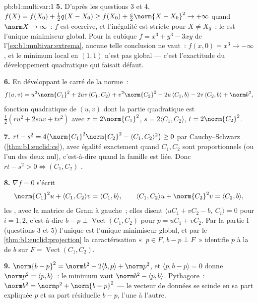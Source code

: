 \begin{solution}{pb:b1:multivar:1}
\textbf{5.} D'après les questions 3 et 4, $f(X) = f(X_0) + \frac12
q(X - X_0) \geq f(X_0) + \frac c2\norm{X - X_0}^2 \to +\infty$
quand $\norm X \to \infty$~: $f$ est coercive, et l'inégalité est
stricte pour $X \neq X_0$~: le  est l'unique
minimiseur global. Pour la cubique $f = x^3 + y^3 - 3xy$ de
l'\cref{ex:b1:multivar:extrema}, aucune telle conclusion ne vaut~:
$f(x,0) = x^3 \to -\infty$, et le minimum local en $(1,1)$ n'est
pas global --- c'est l'exactitude du développement quadratique qui
faisait défaut.

\textbf{6.} En développant le carré de la norme~:
\[
f(u,v) = u^2\norm{C_1}^2 + 2uv\,\langle C_1, C_2\rangle +
v^2\norm{C_2}^2 - 2u\,\langle C_1, b\rangle - 2v\,\langle C_2,
b\rangle + \norm b^2 ,
\]
fonction quadratique de $(u, v)$ dont la partie quadratique est
$\frac12(ru^2 + 2suv + tv^2)$ avec $r = 2\norm{C_1}^2$, $s =
2\langle C_1, C_2\rangle$, $t = 2\norm{C_2}^2$.

\textbf{7.} $rt - s^2 = 4\bigl(\norm{C_1}^2\norm{C_2}^2 -
\langle C_1, C_2\rangle^2\bigr) \geq 0$ par Cauchy--Schwarz
(\cref{thm:b1:euclid:cs}), avec égalité exactement quand $C_1, C_2$
sont proportionnels (ou l'un des deux nul), c'est-à-dire quand la
famille est liée. Donc $rt - s^2 > 0 \iff (C_1, C_2)$ .

\textbf{8.} $\nabla f = 0$ s'écrit
\[
\norm{C_1}^2 u + \langle C_1, C_2\rangle v = \langle C_1,
b\rangle,
\qquad
\langle C_1, C_2\rangle u + \norm{C_2}^2 v = \langle C_2,
b\rangle,
\]
les , avec la matrice de Gram à gauche~; elles
disent $\langle uC_1 + vC_2 - b,\ C_i\rangle = 0$ pour $i = 1, 2$,
c'est-à-dire $b - p \perp \operatorname{Vect}(C_1, C_2)$ pour $p =
uC_1 + vC_2$. Par la partie I (questions 3 et 5) l'unique  est l'unique minimiseur global, et par
le \cref{thm:b1:euclid:projection} la caractérisation «~$p \in
F$, $b - p \perp F$~» identifie $p$ à la 
de $b$ sur $F = \operatorname{Vect}(C_1, C_2)$.

\textbf{9.} $\norm{b - p}^2 = \norm b^2 - 2\langle b, p\rangle +
\norm p^2$, et $\langle p, b - p\rangle = 0$ donne $\norm p^2 =
\langle p, b\rangle$~: le minimum vaut $\norm b^2 - \langle p,
b\rangle$. Pythagore~: $\norm b^2 = \norm p^2 + \norm{b - p}^2$
--- le vecteur de données se scinde en sa part expliquée $p$ et sa
part résiduelle $b - p$,  l'une à l'autre.


\end{solution}
